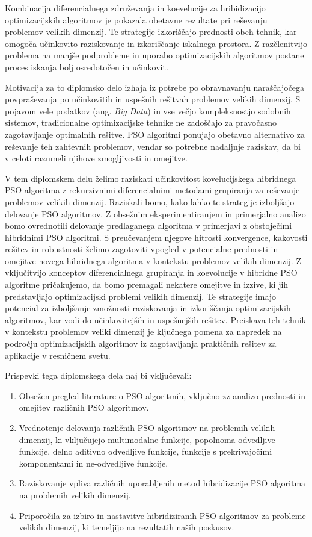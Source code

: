 Kombinacija diferencialnega združevanja in koevelucije za hribidizacijo optimizacijskih algoritmov je pokazala obetavne rezultate pri reševanju problemov velikih dimenzij.
Te strategije izkoriščajo prednosti obeh tehnik, kar omogoča učinkovito raziskovanje in izkoriščanje iskalnega prostora.
Z razčlenitvijo problema na manjše podprobleme in uporabo optimizacijskih algoritmov postane proces iskanja bolj osredotočen in učinkovit.

Motivacija za to diplomsko delo izhaja iz potrebe po obravnavanju naraščajočega povpraševanja po učinkovitih in uspešnih rešitvah problemov velikih dimenzij.
S pojavom vele podatkov (ang. \textit{Big Data}) in vse večjo kompleksnostjo sodobnih sistemov, tradicionalne optimizacijske tehnike ne zadoščajo za pravočasno zagotavljanje optimalnih rešitve.
PSO algoritmi ponujajo obetavno alternativo za reševanje teh zahtevnih problemov, vendar so potrebne nadaljnje raziskav, da bi v celoti razumeli njihove zmogljivosti in omejitve.

V tem diplomskem delu želimo raziskati učinkovitost kovelucijskega hibridnega PSO algoritma z rekurzivnimi diferencialnimi metodami grupiranja za reševanje problemov velikih dimenzij.
Raziskali bomo, kako lahko te strategije izboljšajo delovanje PSO algoritmov.
Z obsežnim eksperimentiranjem in primerjalno analizo bomo ovrednotili delovanje predlaganega algoritma v primerjavi z obstoječimi hibridnimi PSO algoritmi.
S preučevanjem njegove hitrosti konvergence, kakovosti rešitev in robustnosti želimo zagotoviti vpogled v potencialne prednosti in omejitve novega hibridnega algoritma v kontekstu problemov velikih dimenzij.
Z vključitvijo konceptov diferencialnega grupiranja in koevolucije v hibridne PSO algoritme pričakujemo, da bomo premagali nekatere omejitve in izzive, ki jih predstavljajo optimizacijski problemi velikih dimenzij.
Te strategije imajo potencial za izboljšanje zmožnosti raziskovanja in izkoriščanja optimizacijskih algoritmov,  kar vodi do učinkovitejših in uspešnejših rešitev.
Preiskava teh tehnik v kontekstu problemov veliki dimenzij je ključnega pomena za napredek na področju optimizacijskih algoritmov iz zagotavljanja praktičnih rešitev za aplikacije v resničnem svetu.

Prispevki tega diplomskega dela naj bi vključevali:
\begin{enumerate}
    \item Obsežen pregled literature o PSO algoritmih, vključno zz analizo prednosti in omejitev različnih PSO algoritmov.
    \item Vrednotenje delovanja različnih PSO algoritmov na problemih velikih dimenzij, ki vključujejo multimodalne funkcije, popolnoma odvedljive funkcije, delno aditivno odvedljive funkcije, funkcije s prekrivajočimi komponentami in ne-odvedljive funkcije.
    \item Raziskovanje vpliva različnih uporabljenih metod hibridizacije PSO algoritma na problemih velikih dimenzij.
    \item Priporočila za izbiro in nastavitve hibridiziranih PSO algoritmov za probleme velikih dimenzij, ki temeljijo na rezultatih naših poskusov.
\end{enumerate}

